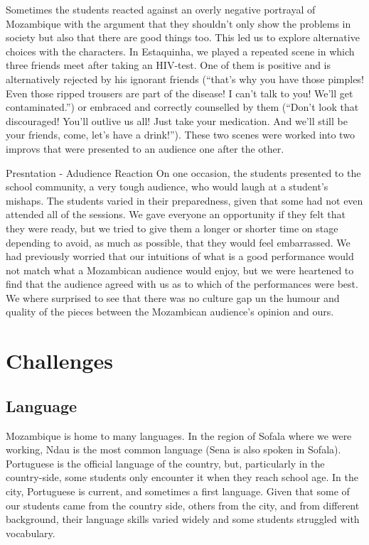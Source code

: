 \documentclass[article,twocolumn,twoside]{memoir}
\begin{document}
Sometimes the students reacted against an overly negative portrayal of
Mozambique with the argument that they shouldn't only show the problems in
society but also that there are good things too. This led us to explore
alternative choices with the characters. In Estaquinha, we played a repeated
scene in which three friends meet after taking an HIV-test. One of them is
positive and is alternatively rejected by his ignorant friends (``that's why
you have those pimples! Even those ripped trousers are part of the disease! I
can't talk to you! We'll get contaminated.'') or embraced and correctly
counselled by them (``Don't look that discouraged! You'll outlive us all! Just
take your medication. And we'll still be your friends, come, let's have a
drink!''). These two scenes were worked into two improvs that were presented to
an audience one after the other.

Presntation - Adudience Reaction
On one occasion, the students presented to the school community, a very tough
audience, who would laugh at a student's mishaps. The students varied in their
preparedness, given that some had not even attended all of the sessions. We
gave everyone an opportunity if they felt that they were ready, but we tried to
give them a longer or shorter time on stage depending to avoid, as much as
possible, that they would feel embarrassed. We had previously worried that our
intuitions of what is a good performance would not match what a Mozambican
audience would enjoy, but we were heartened to find that the audience agreed
with us as to which of the performances were best. We where surprised to see
that there was no culture gap un the humour and quality of the pieces between
the Mozambican audience's opinion and ours.

\chapter{Challenges}
\section{Language}

Mozambique is home to many languages. In the region of Sofala where we were
working, Ndau is the most common language (Sena is also spoken in Sofala).
Portuguese is the official language of the country, but, particularly in the
country-side, some students only encounter it when they reach school age. In
the city, Portuguese is current, and sometimes a first language. Given that
some of our students came from the country side, others from the city, and from
different background, their language skills varied widely and some students
struggled with vocabulary.
\end{document}
